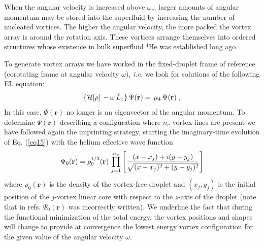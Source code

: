 When the angular velocity is increased 
above $\omega_c$, larger amounts of angular momentum may be stored
into the superfluid by increasing the number of 
nucleated vortices. The higher the angular velocity,  
the more packed the vortex array is
around the rotation axis.  
These vortices arrange themselves into ordered structures  
whose existence in bulk superfluid $^4$He was established long  ago.\cite{Vin61,Wil74}

To generate vortex arrays we have worked in the  
fixed-droplet frame of reference (corotating frame at  
angular velocity $\omega$), {\it i.e.} we look for solutions of the following EL equation: 
%
\begin{equation}
\{{\cal H}[\rho] \,-\omega \,\hat{L}_z\} \,\Psi(\mathbf{r})  =  \,\mu_4 \,
\Psi(\mathbf{r}) \;,
\label{eq15}
\end{equation}
%
In this case, $\Psi(\mathbf{r})$ no longer is  
an eigenvector of the angular momentum.
To determine $\Psi(\mathbf{r})$ describing a 
configuration where $n_v$ vortex lines are present we have followed 
again the imprinting strategy, starting the imaginary-time evolution of  
Eq. (\ref{eq15}) with the helium effective wave function
%
\begin{equation}
\Psi_0(\mathbf{r})=\rho_0^{1/2}(\mathbf{r})\, \prod _{j=1}^{n_v} \left[ {(x-x_j)+\imath (y-y_j) \over \sqrt{(x-x_j)^2+(y-y_j)^2}}  \right] 
\label{eq16}
\end{equation}
%
where  $\rho_0(\mathbf{r})$ is the density of the vortex-free 
droplet and $(x_j, y_j)$ is the initial position of the $j$-vortex linear  core with
respect to the $z$-axis of the droplet (note that in refs. \cite{Anc14,Anc15}  
$\Psi_0(\mathbf{r})$ was incorrectly written).
We underline the fact that during the functional minimization 
of the total energy, the vortex positions and shapes will change
to provide at convergence the lowest energy vortex 
configuration for the given value of the angular velocity $\omega$.  

